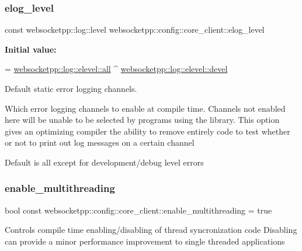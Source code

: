 \subsubsection{\texorpdfstring{elog\+\_\+level}{elog\_level}}
{\footnotesize\ttfamily const websocketpp\+::log\+::level websocketpp\+::config\+::core\+\_\+client\+::elog\+\_\+level\hspace{0.3cm}{\ttfamily [static]}}

{\bfseries Initial value\+:}
\begin{DoxyCode}
=
        \mbox{\hyperlink{structwebsocketpp_1_1log_1_1elevel_a9b31ff708c221d314f9f4eb3ff2b1ad7}{websocketpp::log::elevel::all}} ^ 
      \mbox{\hyperlink{structwebsocketpp_1_1log_1_1elevel_a0b1dbc650c6f2711522c096496423726}{websocketpp::log::elevel::devel}}
\end{DoxyCode}


Default static error logging channels. 

Which error logging channels to enable at compile time. Channels not enabled here will be unable to be selected by programs using the library. This option gives an optimizing compiler the ability to remove entirely code to test whether or not to print out log messages on a certain channel

Default is all except for development/debug level errors \mbox{\label{structwebsocketpp_1_1config_1_1core__client_a20e354b545c8af8bd55ed076f42cb1d7}} 
\subsubsection{\texorpdfstring{enable\+\_\+multithreading}{enable\_multithreading}}
{\footnotesize\ttfamily bool const websocketpp\+::config\+::core\+\_\+client\+::enable\+\_\+multithreading = true\hspace{0.3cm}{\ttfamily [static]}}

Controls compile time enabling/disabling of thread syncronization code Disabling can provide a minor performance improvement to single threaded applications \mbox{\label{structwebsocketpp_1_1config_1_1core__client_a4b68db9b245ec097555f7e99842d96b3}} 
